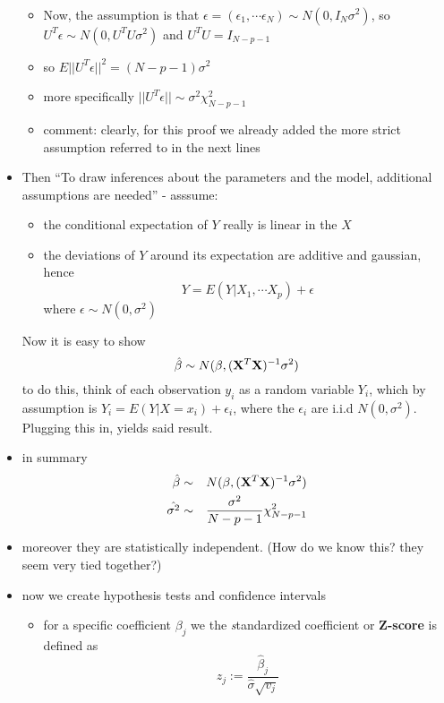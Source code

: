 \documentclass[a4paper]{report}
\newcommand{\red}{\color{red}}
\newcommand{\<}{\textless}
\renewcommand{\>}{\textgreater}
\begin{document}
\begin{itemize}
\begin{itemize}
\begin{eqnarray}
	 \end{eqnarray}
       \item Now, the assumption is that $\epsilon = (\epsilon_1, \cdots \epsilon_N) \sim N(0, I_N\sigma^2)$, so $U^T\epsilon \sim N(0, U^TU\sigma^2)$ and $U^TU = I_{N-p-1}$
       \item so $E||U^T\epsilon||^2 = (N - p - 1) \sigma^2 $
       \item more specifically $||U^T\epsilon|| \sim \sigma^2\chi^2_{N-p-1}$
       \item comment: clearly, for this proof we already added the more strict assumption referred to in the next lines
     \end{itemize}
   \item Then ``To draw inferences about the parameters and the model, additional assumptions are needed'' - asssume:
     \begin{itemize}
       \item the conditional expectation of $Y$ really is linear in the $X$
       \item the deviations of $Y$ around its expectation are additive and gaussian, hence
	 \begin{equation}
	   Y = E(Y|X_1, \cdots X_p) + \epsilon 
	 \end{equation}
	 where $\epsilon \sim N(0, \sigma^2)$
     \end{itemize}
     Now it is easy to show 
     $$ \hat{\beta} \sim N(\beta, ({\bf X}^T {\bf X})^{-1} \sigma^2) $$
     \subitem to do this, think of each observation $y_i$ as a random variable $Y_i$, which by assumption is $Y_i = E(Y|X=x_i) + \epsilon_i$, where the $\epsilon_i$ are i.i.d $N(0,\sigma^2)$. Plugging this in, yields said result. 
   \item in summary
     \begin{eqnarray}
	\hat{\beta} &\sim& N(\beta, ({\bf X}^T {\bf X})^{-1} \sigma^2)  \\
	\hat{\sigma^2} &\sim& \frac{\sigma^2}{N-p-1} \chi^2_{N-p-1}
     \end{eqnarray}
   \item moreover they are statistically independent. {\red (How do we know this? they seem very tied together?)}
   \item now we create hypothesis tests and confidence intervals
     \begin{itemize}
       \item for a specific coefficient $\beta_j$ we the {\emph standardized coefficient} or {\bf Z-score} is defined as
	 $$ z_j := \frac{\hat{\beta}_j}{\hat{\sigma} \sqrt{v_j}} $$

\end{itemize}
\end{itemize}
\end{document}
